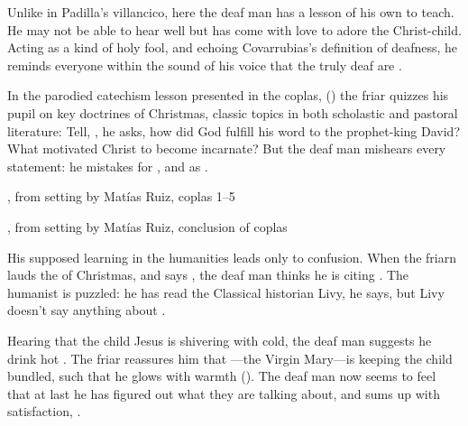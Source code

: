 Unlike in Padilla's villancico, here the deaf man has a lesson of his own to teach.
He may not be able to hear well but has come with love to adore the Christ-child. 
Acting as a kind of holy fool, and echoing Covarrubias's definition of deafness, he reminds everyone within the sound of his voice that the truly deaf are .

In the parodied catechism lesson presented in the coplas, () the friar quizzes his pupil on key doctrines of Christmas, classic topics in both scholastic and pastoral literature:
Tell, , he asks, how did God fulfill his word to the prophet-king David?
What motivated Christ to become incarnate?%
But the deaf man mishears every statement: he mistakes  for , and  as .

\begin{expoem}
    \caption{, from setting by Matías Ruiz, coplas 1--5}
    \label{expoem:Pues_la_fiesta-Ruiz-coplas-1}
\end{expoem}

\begin{expoem}
    \caption{, from setting by Matías Ruiz, conclusion of coplas}
    \label{expoem:Pues_la_fiesta-Ruiz-coplas-2}
\end{expoem}

His supposed learning in the humanities leads only to confusion.
When the friarn lauds the  of Christmas, and says , the deaf man thinks he is citing .
The humanist is puzzled: he has read the Classical historian Livy, he says, but Livy doesn't say anything about .

Hearing that the child Jesus is shivering with cold, the deaf man suggests he drink hot .
The friar reassures him that ---the Virgin Mary---is keeping the child bundled, such that he glows with warmth ().
The deaf man now seems to feel that at last he has figured out what they are talking about, and sums up with satisfaction, .

